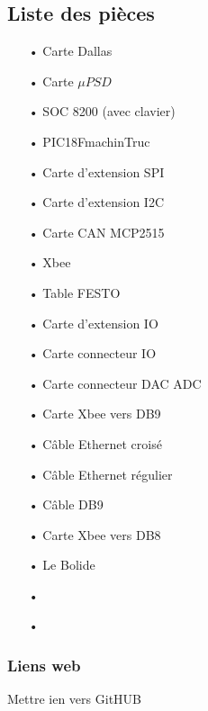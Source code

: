 \documentclass[10pt,a4paper,final]{article}
\begin{document}
\begin{spacing}{1.5}
\subsection{Liste des pièces}
\begin{center}
\HRule
\end{center}
\begin{multicols}{3}
\begin{itemize}
\item[•]Carte Dallas
\item[•]Carte $\mu PSD$
\item[•]SOC 8200 (avec clavier)
\item[•]PIC18FmachinTruc
\item[•]Carte d'extension SPI
\item[•]Carte d'extension I2C
\item[•]Carte CAN MCP2515
\item[•]Xbee
\item[•]Table FESTO
\item[•]Carte d'extension IO
\item[•]Carte connecteur IO
\item[•]Carte connecteur DAC ADC
\item[•]Carte Xbee vers DB9
\item[•]Câble Ethernet croisé
\item[•]Câble Ethernet régulier
\item[•]Câble DB9
\item[•]Carte Xbee vers DB8
\item[•]Le Bolide
\item[•]
\item[•]
\end{itemize}
\end{multicols}
\begin{center}
\HRule
\end{center}

\subsubsection{Liens web}
Mettre ien vers GitHUB
\pagebreak

\end{spacing}
\end{document}
